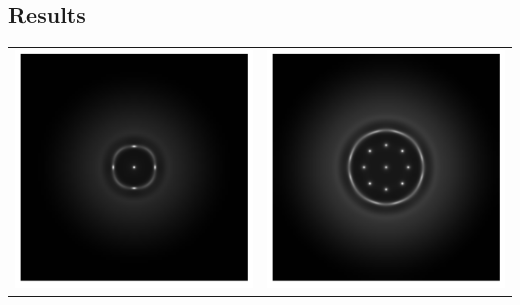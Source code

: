 \documentclass[compress,12pt]{beamer}
\begin{document}
\subsection{Results}
\begin{frame}
    {
      \begin{center}
	\begin{tabular}{cc}
	  \includegraphics[height=.4\textheight]{figures/ecoli0010} &
	  \includegraphics[height=.4\textheight]{figures/ecoli0015} \\ 

\end{tabular}
\end{center}}
\end{frame}
\end{document}
